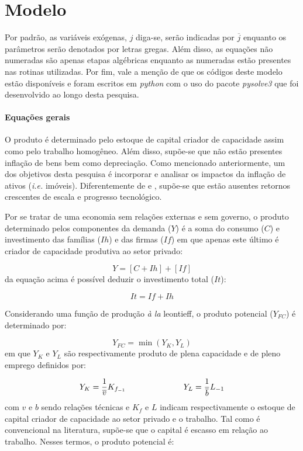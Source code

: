 \section{Modelo}
\label{SecModelo}

Por padrão, as variáveis exógenas, $j$ diga-se, serão indicadas por $\overline{j}$ enquanto os parâmetros serão denotados por letras gregas. Além disso, as equações não numeradas são apenas etapas algébricas enquanto as numeradas estão presentes nas rotinas utilizadas. Por fim, vale a menção de que os códigos deste modelo estão disponíveis e foram escritos em \textit{python} com o uso do pacote \textit{pysolve3} que foi desenvolvido ao longo desta pesquisa.

\paragraph*{Equações gerais}
O produto é determinado pelo estoque de capital criador de capacidade assim como pelo trabalho homogêneo. Além disso, supõe-se que não estão presentes inflação de bens bem como depreciação.  Como mencionado anteriormente, um dos objetivos desta pesquisa é incorporar e analisar os impactos da inflação de ativos (\textit{i.e.} imóveis).
Diferentemente de \textcite{nikiforos_utilization_2016} e \textcite{dutt_observations_2018}, supõe-se que estão ausentes retornos crescentes de escala e progresso tecnológico.

Por se tratar de uma economia sem relações externas e sem governo, o produto determinado pelos componentes da demanda ($Y$) é a soma do consumo ($C$) e investimento das famílias ($Ih$) e das firmas ($If$) em que apenas este último é criador de capacidade produtiva ao setor privado:

\begin{equation}
\label{_Y}
    Y = [C + Ih] + [If]
\end{equation}
da equação acima é possível deduzir o investimento total ($It$):

\begin{equation}
\label{_It}
    It = If + Ih
\end{equation}

Considerando uma função de produção \textit{à la} leontieff, o produto potencial ($Y_{FC}$) é determinado por:

$$
Y_{FC} = \min (Y_K, Y_L)
$$
em que $Y_K$ e $Y_L$ são respectivamente produto de plena capacidade e de pleno emprego definidos por:

$$
Y_K = \frac{1}{\overline v}K_{f_{-1}} \hspace{2.5cm} Y_L = \frac{1}{\overline b}L_{-1}
$$
com $v$ e $b$ sendo relações técnicas e $K_f$ e $L$ indicam respectivamente o estoque de capital criador de capacidade ao setor privado e  o trabalho. Tal como é convencional na literatura, supõe-se que o capital é escasso em relação ao trabalho. Nesses termos, o produto potencial é:

